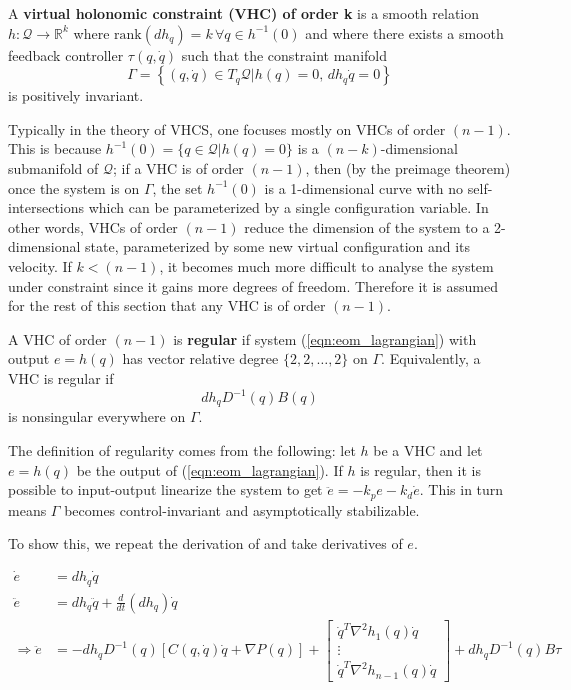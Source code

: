 \begin{defn}\label{defn:vhc_order_k}
   A \textbf{virtual holonomic constraint (VHC) of order k} is a smooth relation 
   \( h : \mathcal{Q} \rightarrow \mathbb{R}^k\) where
   \( \text{rank}(dh_q) = k \, \forall q \in h^{-1}(0)\) and where there exists
   a smooth feedback controller \(\tau(q,\dot{q})\) such that the constraint
   manifold
   \[
      \Gamma = \left\{ (q,\dot{q}) \in T_q\mathcal{Q} \vert h(q) = 0, \, 
      dh_q \dot{q} = 0\right\}
   \]
   is positively invariant.
\end{defn}

Typically in the theory of VHCS, one focuses mostly on VHCs of order \((n-1)\).
This is because \(h^{-1}(0) = \{q \in \mathcal{Q} \vert h(q) = 0\}\) is a
\((n-k)\)-dimensional submanifold of \(\mathcal{Q}\); if a VHC is of order
\((n-1)\), then (by the preimage theorem) once the system is on \(\Gamma\), the
set \(h^{-1}(0)\) is a 1-dimensional curve with no self-intersections which can
be parameterized by a single configuration variable. In other words, VHCs of
order \((n-1)\) reduce the dimension of the system to a 2-dimensional state,
parameterized by some new virtual configuration and its velocity.  If \(k <
(n-1)\), it becomes much more difficult to analyse the system under constraint
since it gains more degrees of freedom. Therefore it is assumed for the rest of
this section that any VHC is of order \((n-1)\).

\begin{defn}\label{defn:vhc_regular}
   A VHC of order \((n-1)\) is \textbf{regular} if 
   system (\ref{eqn:eom_lagrangian}) with output \(e = h(q)\) has vector
   relative degree \(\{2,2,\ldots,2\}\) on \(\Gamma\).
   Equivalently, a VHC is regular if 
   \[
      dh_q D^{-1}(q)B(q)
   \]
   is nonsingular everywhere on \(\Gamma\).
\end{defn}

The definition of regularity comes from the following: 
let \(h\) be a VHC and let \(e = h(q)\) be the
output of (\ref{eqn:eom_lagrangian}). If \(h\) is regular, then
it is possible to input-output
linearize the system to get \(\ddot{e} = -k_p e - k_d \dot{e}\). This
in turn means \(\Gamma\) becomes control-invariant and asymptotically
stabilizable.

To show this, we repeat the derivation of
\textcite{vhcs_for_el_systems,lagrangian_structure_reduced_dynamics_vhcs} and take
derivatives of \(e\).

\begin{align*}
   \dot{e} &= dh_q \dot{q} \\
   \ddot{e} &= dh_q \ddot{q} + \frac{d}{dt}\left(dh_q\right)\dot{q}\\
   \Rightarrow \ddot{e} &= 
      -dh_qD^{-1}(q)\left[C(q,\dot{q})\dot{q} + \nabla P(q) \right] 
      + \begin{bmatrix}
         \dot{q}^T \nabla^2 h_1(q) \dot{q} \\
         \vdots \\
         \dot{q}^T \nabla^2 h_{n-1}(q) \dot{q}
      \end{bmatrix}
      + dh_q D^{-1}(q)B\tau \\
\end{align*}

